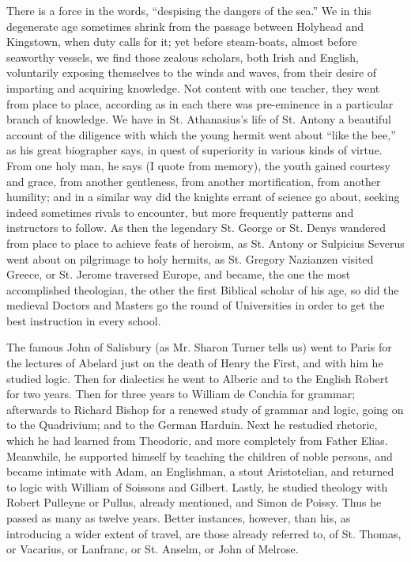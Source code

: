 There is a force in the words,
``despising the dangers of the sea.'' We in this degenerate age
sometimes shrink from the passage between Holyhead and Kingstown, when
duty calls for it; yet before steam-boats, almost before seaworthy
vessels, we find those zealous scholars, both Irish and English,
voluntarily exposing themselves to the winds and waves, from their
desire of imparting and acquiring knowledge. Not content with one
teacher, they went from place to place, according as in each there was
pre-eminence in a particular branch of knowledge. We have in St.
Athanasius's life of St. Antony a beautiful account of the diligence
with which the young hermit went about ``like the bee,'' as his
great biographer says, in quest of superiority in various kinds of
virtue. From one holy man, he says (I quote from memory), the youth
gained courtesy and grace, from another gentleness, from another
mortification, from another humility; and in a similar way did
the knights errant of science go about, seeking indeed sometimes
rivals to encounter, but more frequently patterns and instructors to
follow. As then the legendary St. George or St. Denys wandered from
place to place to achieve feats of heroism, as St. Antony or Sulpicius
Severus went about on pilgrimage to holy hermits, as St. Gregory
Nazianzen visited Greece, or St. Jerome traversed Europe, and became,
the one the most accomplished theologian, the other the first Biblical
scholar of his age, so did the medieval Doctors and Masters go the
round of Universities in order to get the best instruction in every
school.

The famous John of Salisbury
(as Mr. Sharon Turner tells us) went to Paris for the lectures of
Abelard just on the death of Henry the First, and with him he studied
logic. Then for dialectics he went to Alberic and to the English
Robert for two years. Then for three years to William de Conchia for
grammar; afterwards to Richard Bishop for a renewed study of grammar
and logic, going on to the Quadrivium; and to the German Harduin. Next
he restudied rhetoric, which he had learned from Theodoric, and more
completely from Father Elias. Meanwhile, he supported himself by
teaching the children of noble persons, and became intimate with Adam,
an Englishman, a stout Aristotelian, and returned to logic with
William of Soissons and Gilbert. Lastly, he studied theology with
Robert Pulleyne or Pullus, already mentioned, and Simon de Poissy.
Thus he passed as many as twelve years. Better instances, however,
than his, as introducing a wider extent of travel, are those already
referred to, of St. Thomas, or Vacarius, or Lanfranc, or St. Anselm,
or John of Melrose.

